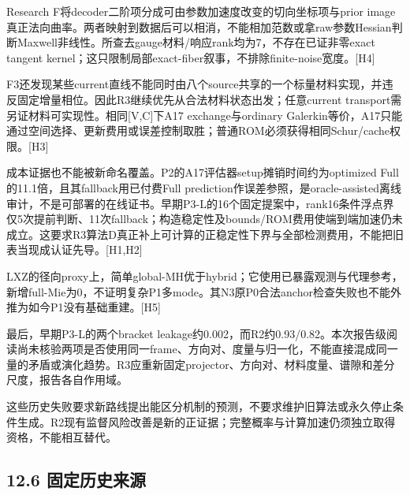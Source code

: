 \documentclass[
  11pt,
  a4paper,
]{article}
\begin{document}
Research F将decoder二阶项分成可由参数加速度改变的切向坐标项与prior
image真正法向曲率。两者映射到数据后可以相消，不能相加范数或拿raw参数Hessian判断Maxwell非线性。所查去gauge材料/响应rank均为7，不存在已证非零exact
tangent
kernel；这只限制局部exact-fiber叙事，不排除finite-noise宽度。{[}H4{]}

F3还发现某些current直线不能同时由八个source共享的一个标量材料实现，并违反固定增量相位。因此R3继续优先从合法材料状态出发；任意current
transport需另证材料可实现性。相同{[}V,C{]}下A17 exchange与ordinary
Galerkin等价，A17只能通过空间选择、更新费用或误差控制取胜；普通ROM必须获得相同Schur/cache权限。{[}H3{]}

成本证据也不能被新命名覆盖。P2的A17评估器setup摊销时间约为optimized
Full的11.1倍，且其fallback用已付费Full
prediction作误差参照，是oracle-assisted离线审计，不是可部署的在线证书。早期P3-L的16个固定提案中，rank16条件浮点界仅5次提前判断、11次fallback；构造稳定性及bounds/ROM费用使端到端加速仍未成立。这要求R3算法D真正补上可计算的正稳定性下界与全部检测费用，不能把旧表当现成认证先导。{[}H1,H2{]}

LXZ的径向proxy上，简单global-MH优于hybrid；它使用已暴露观测与代理参考，新增full-Mie为0，不证明复杂P1多mode。其N3原P0合法anchor检查失败也不能外推为如今P1没有基础重建。{[}H5{]}

最后，早期P3-L的两个bracket
leakage约0.002，而R2约0.93/0.82。本次报告级阅读尚未核验两项是否使用同一frame、方向对、度量与归一化，不能直接混成同一量的矛盾或演化趋势。R3应重新固定projector、方向对、材料度量、谱隙和差分尺度，报告各自作用域。

这些历史失败要求新路线提出能区分机制的预测，不要求维护旧算法或永久停止条件生成。R2现有监督风险改善是新的正证据；完整概率与计算加速仍须独立取得资格，不能相互替代。

\hypertarget{ux56faux5b9aux5386ux53f2ux6765ux6e90}{%
\subsection{12.6
固定历史来源}\label{ux56faux5b9aux5386ux53f2ux6765ux6e90}}
\end{document}

